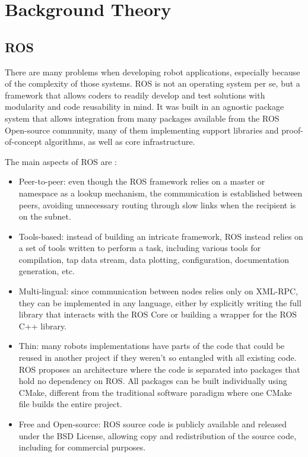 \chapter{Background Theory}\label{chp:fundament}

%

\section{ROS}

There are many problems when developing robot applications, especially because of the complexity of those systems. ROS is not an operating system per se, but a framework that allows coders to readily develop and test solutions with modularity and code reusability in mind. It was built in an agnostic package system that allows integration from many packages available from the ROS Open-source community, many of them implementing support libraries and proof-of-concept algorithms, as well as core infrastructure.

The main aspects of ROS are \cite{quigley2009ros}:

\begin{itemize}
\item Peer-to-peer: even though the ROS framework relies on a master or namespace as a lookup mechanism, the communication is established between peers, avoiding unnecessary routing through slow links when the recipient is on the subnet.
\item Tools-based: instead of building an intricate framework, ROS instead relies on a set of tools written to perform a task, including various tools for compilation, tap data stream, data plotting, configuration, documentation generation, etc.
\item Multi-lingual: since communication between nodes relies only on XML-RPC, they can be implemented in any language, either by explicitly writing the full library that interacts with the ROS Core or building a wrapper for the ROS C++ library.
\item Thin: many robots implementations have parts of the code that could be reused in another project if they weren't so entangled with all existing code. ROS proposes an architecture where the code is separated into packages that hold no dependency on ROS. All packages can be built individually using CMake, different from the traditional software paradigm where one CMake file builds the entire project.
\item Free and Open-source: ROS source code is publicly available and released under the BSD License, allowing copy and redistribution of the source code, including for commercial purposes.
\end{itemize}

